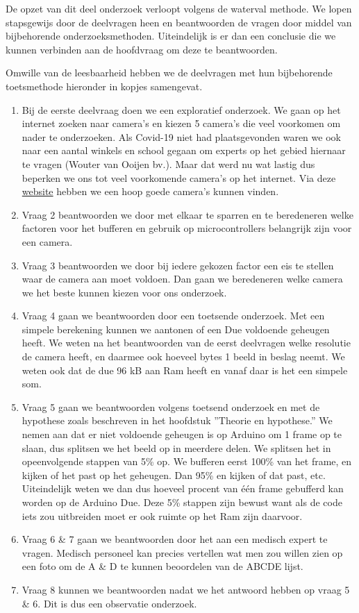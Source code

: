 \documentclass{article}
\begin{document}
De opzet van dit deel onderzoek verloopt volgens de waterval methode.
We lopen stapsgewijs door de deelvragen heen en beantwoorden de vragen door middel van bijbehorende onderzoeksmethoden.
Uiteindelijk is er dan een conclusie die we kunnen verbinden aan de hoofdvraag om deze te beantwoorden.

Omwille van de leesbaarheid hebben we de deelvragen met hun bijbehorende toetsmethode hieronder in kopjes samengevat.

\begin{enumerate}
	\item Bij de eerste deelvraag doen we een exploratief onderzoek. We gaan op het internet zoeken naar camera’s en kiezen 5 camera’s die veel voorkomen om nader te onderzoeken. Als Covid-19 niet had plaatsgevonden waren we ook naar een aantal winkels en school gegaan om experts op het gebied hiernaar te vragen (Wouter van Ooijen bv.). Maar dat werd nu wat lastig dus beperken we ons tot veel voorkomende camera’s op het internet. Via deze \href{https://www.open-electronics.org/a-complete-guide-to-arduino-based-video-camera/}{website} hebben we een hoop goede camera’s kunnen vinden.
	\item Vraag 2 beantwoorden we door met elkaar te sparren en te beredeneren welke factoren voor het bufferen en gebruik op microcontrollers belangrijk zijn voor een camera.
	\item Vraag 3 beantwoorden we door bij iedere gekozen factor een eis te stellen waar de camera aan moet voldoen. Dan gaan we beredeneren welke camera we het beste kunnen kiezen voor ons onderzoek.
	\item Vraag 4 gaan we beantwoorden door een toetsende onderzoek. Met een simpele berekening kunnen we aantonen of een Due voldoende geheugen heeft. We weten na het beantwoorden van de eerst deelvragen welke resolutie de camera heeft, en daarmee ook hoeveel bytes 1 beeld in beslag neemt. We weten ook dat de due 96 kB aan Ram heeft en vanaf daar is het een simpele som.
	\item Vraag 5 gaan we beantwoorden volgens toetsend onderzoek en met de hypothese zoals beschreven in het hoofdstuk ”Theorie en hypothese.” We nemen aan dat er niet voldoende geheugen is op Arduino om 1 frame op te slaan, dus splitsen we het beeld op in meerdere delen. We splitsen het in opeenvolgende stappen van 5\% op. We bufferen eerst 100\% van het frame, en kijken of het past op het geheugen. Dan 95\% en kijken of dat past, etc. Uiteindelijk weten we dan dus hoeveel procent van één frame gebufferd kan worden op de Arduino Due. Deze 5\% stappen zijn bewust want als de code iets zou uitbreiden moet er ook ruimte op het Ram zijn daarvoor.
	\item Vraag 6 {\&} 7 gaan we beantwoorden door het aan een medisch expert te vragen. Medisch personeel kan precies vertellen wat men zou willen zien op een foto om de A {\&} D te kunnen beoordelen van de ABCDE lijst.
	\item Vraag 8 kunnen we beantwoorden nadat we het antwoord hebben op vraag 5 {\&} 6. Dit is dus een observatie onderzoek.

\end{enumerate}
\end{document}

